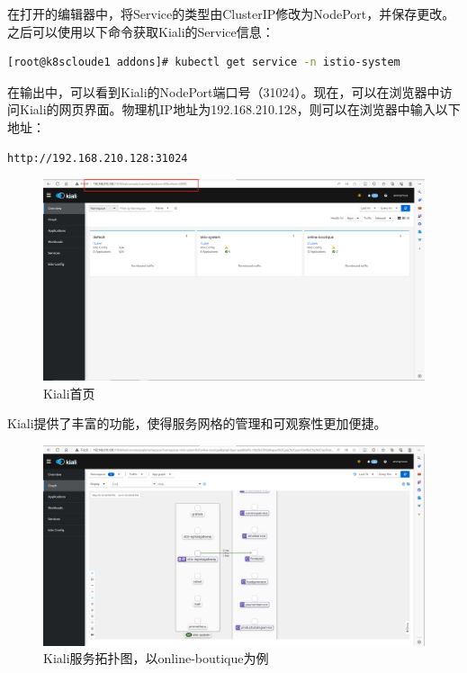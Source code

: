 在打开的编辑器中，将Service的类型由ClusterIP修改为NodePort，并保存更改。之后可以使用以下命令获取Kiali的Service信息：
\begin{lstlisting}[language=bash]
[root@k8scloude1 addons]# kubectl get service -n istio-system
\end{lstlisting}

在输出中，可以看到Kiali的NodePort端口号（31024）。现在，可以在浏览器中访问Kiali的网页界面。物理机IP地址为192.168.210.128，则可以在浏览器中输入以下地址：
\begin{lstlisting}[language=bash]
http://192.168.210.128:31024
\end{lstlisting}
\begin{figure}[H]
	\centering
	\includegraphics[width=1.0\textwidth]{figures/chapter3/kiali}
	\caption{Kiali首页}
	\label{fig:3-Kiali首页}
\end{figure}
Kiali提供了丰富的功能，使得服务网格的管理和可观察性更加便捷。
\begin{figure}[H]
	\centering
	\includegraphics[width=1.0\textwidth]{figures/chapter3/online-boutique-kiali.png}
	\caption{Kiali服务拓扑图，以online-boutique为例}
	\label{fig:Kiali服务拓扑图，以online-boutique为例}
\end{figure}

